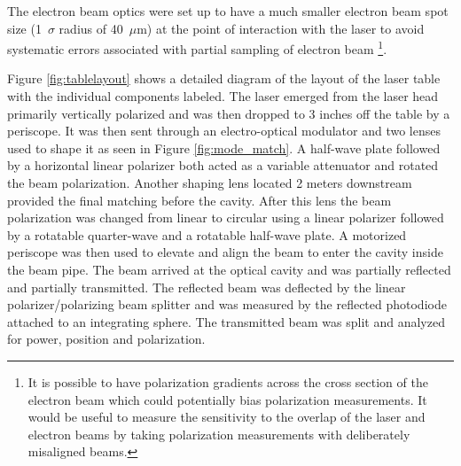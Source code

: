  The electron beam optics were set up to have a much smaller electron beam spot size (1~$\sigma$ radius of 40~$\mu$m) at the point of interaction with the laser to avoid systematic errors associated with partial sampling of electron beam \footnote{It is possible to have polarization gradients across the cross section of the electron beam which could potentially bias polarization measurements. It would be useful to measure the sensitivity to the overlap of the laser and electron beams by taking polarization measurements with deliberately misaligned beams.}.  

Figure \ref{fig:tablelayout} shows a detailed diagram of the layout of the laser table with the individual components labeled. The laser emerged from the laser head primarily vertically polarized and was then dropped to 3 inches off the table by a periscope. It was then sent through an electro-optical modulator and two lenses used to shape it as seen in Figure \ref{fig:mode_match}. A half-wave plate followed by a horizontal linear polarizer both acted as a variable attenuator and rotated the beam polarization. Another shaping lens located 2 meters downstream provided the final matching before the cavity. After this lens the beam polarization was changed from linear to circular using a linear polarizer followed by a rotatable quarter-wave and a rotatable half-wave plate. A motorized periscope was then used to elevate and align the beam to enter the cavity inside the beam pipe. The beam arrived at the optical cavity and was partially reflected and partially transmitted. The reflected beam was deflected by the linear polarizer/polarizing beam splitter and was measured by the reflected photodiode attached to an integrating sphere. The transmitted beam was split and analyzed for power, position and polarization.

